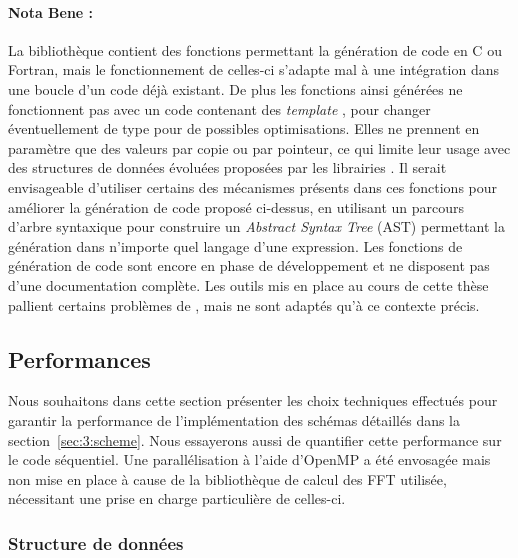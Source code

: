 \paragraph{Nota Bene :} La bibliothèque \sympy{} contient des fonctions permettant la génération de code en C ou Fortran, mais le fonctionnement de celles-ci s'adapte mal à une intégration dans une boucle d'un code déjà existant. De plus les fonctions ainsi générées ne fonctionnent pas avec un code contenant des \emph{template} \CC, pour changer éventuellement de type pour de possibles optimisations. Elles ne prennent en paramètre que des valeurs par copie ou par pointeur, ce qui limite leur usage avec des structures de données évoluées proposées par les librairies \CC. Il serait envisageable d'utiliser certains des mécanismes présents dans ces fonctions pour améliorer la génération de code proposé ci-dessus, en utilisant un parcours d'arbre syntaxique pour construire un \emph{Abstract Syntax Tree} (AST) permettant la génération dans n'importe quel langage d'une expression. Les fonctions \sympy{} de génération de code sont encore en phase de développement et ne disposent pas d'une documentation complète. Les outils mis en place au cours de cette thèse pallient certains problèmes de \sympy{}, mais ne sont adaptés qu'à ce contexte précis.

\subsection{Performances}

Nous souhaitons dans cette section présenter les choix techniques effectués pour garantir la performance de l'implémentation des schémas détaillés dans la section~\ref{sec:3:scheme}. Nous essayerons aussi de quantifier cette performance sur le code séquentiel. Une parallélisation à l'aide d'OpenMP a été envosagée mais non mise en place à cause de la bibliothèque de calcul des FFT utilisée, nécessitant une prise en charge particulière de celles-ci.

\subsubsection{Structure de données}


